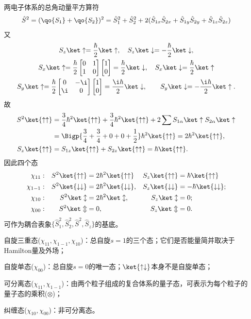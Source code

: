 两电子体系的总角动量平方算符
\begin{align*}
	\hat S^2=(\qo{S_1}+\qo{S_2})^2=\hat S_1^2+\hat S_2^2+2(\hat S_{1x}\hat S_{2x}+\hat S_{1y}\hat S_{2y}+\hat S_{1z}\hat S_{2z})
\end{align*}
又
\begin{gather*}
	S_z\ket\uparrow=\frac\hbar{2}\ket\uparrow,\quad S_z\ket\downarrow=-\frac\hbar{2}\ket\downarrow,\\
	S_x\ket\uparrow=\frac\hbar{2}\begin{bmatrix}0&1\\1&0\end{bmatrix}\begin{bmatrix}1\\0\end{bmatrix}=\frac\hbar{2}\ket\downarrow,\quad S_x\ket\downarrow=\frac\hbar{2}\ket\uparrow\\
	S_y\ket\uparrow=\frac\hbar{2}\begin{bmatrix}0&-\i\\\i&0\end{bmatrix}\begin{bmatrix}1\\0\end{bmatrix}=\frac{\i\hbar}{2}\ket\downarrow,\quad \quad S_y\ket\downarrow=-\frac{\i\hbar}{2}\ket\uparrow.
\end{gather*}
故
\begin{align*}
	S^2\ket{\uparrow\uparrow}&=\frac34\hbar^2\ket{\uparrow\uparrow}+\frac34\hbar^2\ket{\uparrow\uparrow}+2\sum S_{1\alpha}\ket\uparrow S_{2\alpha}\ket\uparrow\\
	&=\Bigp{\frac34+\frac34+0+0+\frac12}\hbar^2\ket{\uparrow\uparrow}=2\hbar^2\ket{\uparrow\uparrow},\\
	S_z\ket{\uparrow\uparrow}&=S_{1z}\ket{\uparrow\uparrow}+S_{2z}\ket{\uparrow\uparrow}=\hbar\ket{\uparrow\uparrow}.
\end{align*}
因此四个态
\begin{align*}
	\chi_{11}&:&S^2\ket{\uparrow\uparrow}&=2\hbar^2\ket{\uparrow\uparrow}&S_z\ket{\uparrow\uparrow}&=\hbar\ket{\uparrow\uparrow}\\
	\chi_{1-1}&:&S^2\ket{\downarrow\downarrow}&=2\hbar^2\ket{\downarrow\downarrow},&S_z\ket{\downarrow\downarrow}&=-\hbar\ket{\downarrow\downarrow};\\
	\chi_{10}&:&S^2\ket\updownarrow&=2\hbar^2\ket\updownarrow,&S_z\ket\updownarrow&=0;\\
	\chi_{00}&:&S^2\ket\Updownarrow&=0,&S_z\ket\Updownarrow&=0.
\end{align*}
可作为耦合表象$\{\hat S_1^2,\hat S_2^2,\hat S^2,\hat S_z\}$的基底。
\begin{compactitem}
	\item 自旋三重态($\chi_{11},\chi_{1-1},\chi_{10}$)：总自旋$s=1$的三个态；它们是否能量简并取决于Hamilton量及外场；
	\item 自旋单态($\chi_{00}$)：总自旋$s=0$的唯一态；$\ket{\uparrow\downarrow}$本身不是自旋单态；
	\item 可分离态($\chi_{11},\chi_{1-1}$)：由两个粒子组成的复合体系的量子态，可表示为每个粒子的量子态的乘积($\otimes$)；
	\item 纠缠态($\chi_{10},\chi_{00}$)：非可分离态。
\end{compactitem}